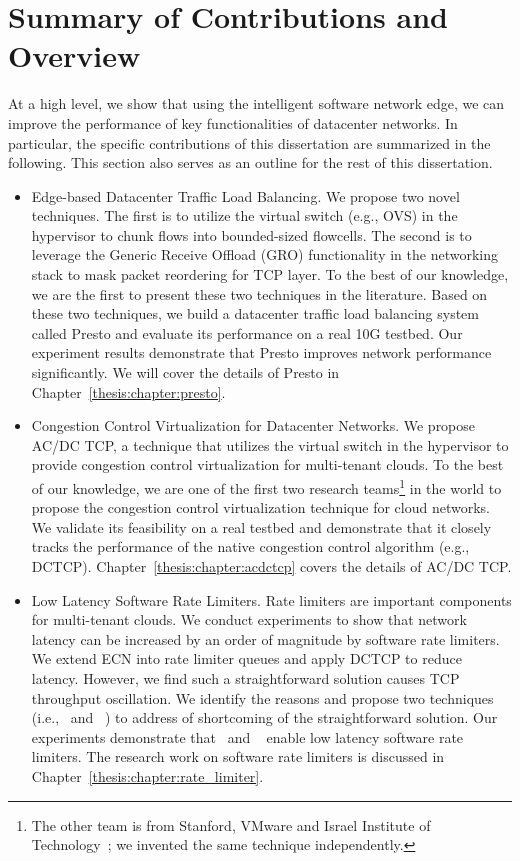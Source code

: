 \section{Summary of Contributions and Overview}

At a high level, we show that using the intelligent software network edge, 
we can improve the performance of key functionalities of datacenter networks. In particular, 
the specific contributions of this dissertation are summarized in the following. 
This section also serves as an outline for the rest of this dissertation.

\begin{itemize}
\item Edge-based Datacenter Traffic Load Balancing. We propose two novel techniques. 
The first is to utilize the virtual switch (e.g., OVS) in the hypervisor to chunk flows into bounded-sized flowcells. 
The second is to leverage the Generic Receive Offload (GRO) functionality in the networking stack to 
mask packet reordering for TCP layer. To the best of our knowledge, we are the first to 
present these two techniques in the literature. Based on these two techniques, we build a datacenter 
traffic load balancing system called Presto and evaluate its performance on a real 10G testbed. 
Our experiment results demonstrate that Presto improves network performance significantly. 
We will cover the details of Presto in Chapter~\ref{thesis:chapter:presto}.
 
\item Congestion Control Virtualization for Datacenter Networks. 
We propose AC/DC TCP, a technique that utilizes the virtual switch in the hypervisor 
to provide congestion control virtualization for multi-tenant clouds. 
To the best of our knowledge, we are one of the first two research teams\footnote{The other team is from 
Stanford, VMware and Israel Institute of Technology~\cite{vcc}; we invented the same technique independently.} in the world to 
propose the congestion control virtualization technique for cloud networks. 
We validate its feasibility on a real testbed and demonstrate that it closely tracks the performance of
the native congestion control algorithm (e.g., DCTCP). Chapter~\ref{thesis:chapter:acdctcp} covers the details of AC/DC TCP.
 
\item Low Latency Software Rate Limiters. Rate limiters are important 
components for multi-tenant clouds. We conduct experiments to show that network latency 
can be increased by an order of magnitude by software rate limiters. We extend ECN into rate 
limiter queues and apply DCTCP to reduce latency. However, we find such a straightforward 
solution causes TCP throughput oscillation. We identify the reasons and propose 
two techniques (i.e.,~\dem{} and ~\spring{}) to address of shortcoming of the 
straightforward solution. Our experiments demonstrate that~\dem{} and ~\spring{} enable 
low latency software rate limiters. The research work on software rate limiters is 
discussed in Chapter~\ref{thesis:chapter:rate_limiter}.


\end{itemize}
